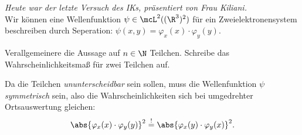 \documentclass{subfiles}
\begin{document}
    \emph{Heute war der letzte Versuch des IKs, präsentiert von Frau Kiliani.}\\

    Wir können eine Wellenfunktion $\psi\in\mcL^2((\R^3)^2)$ für ein Zweielektronensystem beschreiben durch Seperation: $\psi(x,y) = \varphi_x(x)\cdot\varphi_y(y)$. 

    \begin{Aufgabe}
        \nr{} Verallgemeinere die Aussage auf $n\in\N$ Teilchen. Schreibe das Wahrscheinlichkeitsmaß für zwei Teilchen auf. 
    \end{Aufgabe}
    Da die Teilchen \emph{ununterscheidbar} sein sollen, muss die Wellenfunktion $\psi$ \emph{symmetrisch} sein, also die Wahrscheinlichkeiten sich bei umgedrehter Ortsauswertung gleichen:
    \[
        \abs{\varphi_x(x)\cdot \varphi_y(y)}^2 \stackrel{!}{=} \abs{\varphi_x(y)\cdot \varphi_y(x)}^2.
    \]
    
\end{document}
